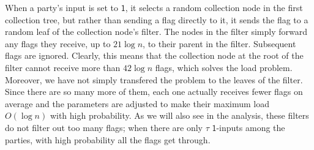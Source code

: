 \documentclass[11pt,letter]{article}
\theoremstyle{mytheoremstyle}
\newcommand{\oneinputs}{$\mathsf{1}$-inputs\xspace}
\begin{document}
When a party's input is set to $\mathsf{1}$, it selects a random collection node in the first collection tree, but rather than sending a flag directly to it, it sends the flag to a random leaf of the collection node's filter. The nodes in the filter simply forward any flags they receive, up to $21\log{n}$, to their parent in the filter. Subsequent flags are ignored. Clearly, this means that the collection node at the root of the filter cannot receive more than $42 \log{n}$ flags, which solves the load problem. Moreover, we have not simply transfered the problem to the leaves of the filter. Since there are so many more of them, each one actually receives fewer flags on average and the parameters are adjusted to make their maximum load $O(\log{n})$ with high probability. As we will also see in the analysis, these filters do not filter out too many flags; when there are only $\tau$ \oneinputs among the parties, with high probability all the flags get through.
\end{document}

